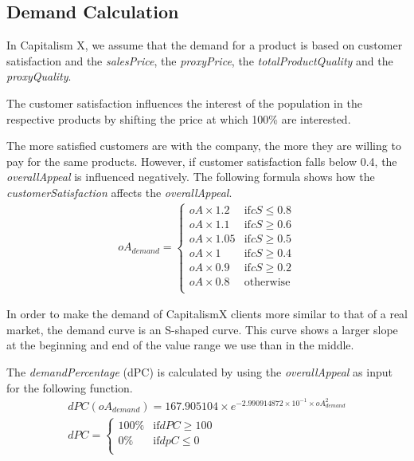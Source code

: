 \subsection{Demand Calculation} 
\label{demandCalc}

In Capitalism X, we assume that the demand for a product is based on customer satisfaction and the \textit{salesPrice}, the \textit{proxyPrice}, the \textit{totalProductQuality} and the \textit{proxyQuality}.

The customer satisfaction influences the interest of the population in the respective products by shifting the price at which 100\% are interested.
 
The more satisfied customers are with the company, the more they are willing to pay for the same products. However, if customer satisfaction falls below 0.4, the \textit{overallAppeal} is influenced negatively. The following formula shows how the \textit{customerSatisfaction} affects the \textit{overallAppeal}.
\begin{equation}
\label{func:demandPrice}
\begin{aligned}
 oA_{demand} = 
\begin{cases}
    oA \times 1.2 & \text{if} cS \leq 0.8 \\
    oA \times 1.1 & \text{if} cS \geq 0.6 \\
    oA \times 1.05 & \text{if} cS \geq 0.5 \\
    oA \times 1 & \text{if} cS \geq 0.4 \\
    oA \times 0.9 & \text{if} cS \geq 0.2 \\
    oA \times 0.8 & \text{otherwise} \\
\end{cases}
\end{aligned}
\end{equation}

In order to make the demand of CapitalismX clients more similar to that of a real market, the demand curve is an S-shaped curve. This curve shows a larger slope at the beginning and end of the value range we use than in the middle.

The \textit{demandPercentage} (\gls{dPC}) is calculated by using the \textit{overallAppeal} as input for the following function. 
\begin{equation}
\label{func:demandPercentage}
\begin{aligned}
dPC(oA_{demand}) = 167.905104 \times e^{−2.990914872 \times 10^{ -1 } \times oA_{demand}^{ 2 } } \\
dPC = 
    \begin{cases}
        100\% & \text{if} dPC \geq 100\\
        0\% & \text{if} dpC \leq 0\\
    \end{cases}
\end{aligned}
\end{equation}


